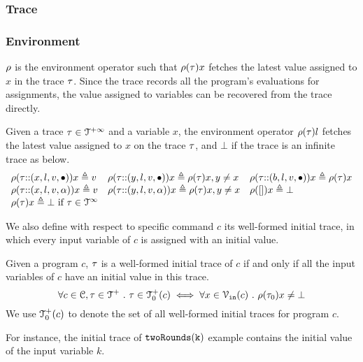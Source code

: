 \subsubsection{Trace}


\subsubsection{Environment} 
$\rho$ is the environment operator such that $\rho(\mathtt{\tau}) x$ fetches the latest value assigned to $x$ in the trace $\mathtt{\tau}$.
Since the trace records all the program's evaluations for assignments, 
the value assigned to variables can be recovered from the trace directly.
 \begin{defn}
 \label{def:adapt_env}
Given a trace $\mathtt{\tau} \in \mathcal{T}^{+\infty}$ and a variable $x$,
the environment operator $\rho(\mathtt{\tau}) l $ fetches the latest value assigned to $x$ on the trace $\mathtt{\tau}$,
and $\bot$ if the trace is an infinite trace as below.
\[
\begin{array}{lll}
\rho(\mathtt{\tau} {\small ::} (x, l, v, \bullet)) x \triangleq v
&
\rho(\mathtt{\tau} {\small ::} (y, l, v, \bullet)) x \triangleq \rho(\mathtt{\tau}) x, y \neq x
&
\rho(\mathtt{\tau} {\small ::} (b, l, v, \bullet)) x \triangleq \rho(\mathtt{\tau}) x
\\
\rho(\mathtt{\tau} {\small ::} (x, l, v, \alpha)) x \triangleq v
&
\rho(\mathtt{\tau} {\small ::} (y, l, v, \alpha)) x \triangleq \rho(\mathtt{\tau}) x, y \neq x
&
\rho({[]} ) x \triangleq \bot
\\
\rho(\mathtt{\tau} ) x \triangleq \bot ~ \text{if}~ \mathtt{\tau} \in \mathcal{T}^{\infty}
\end{array}
\]
\end{defn}
We also define with respect to specific command $c$ its well-formed initial trace, in which
every input variable of $c$ is assigned with an initial value.
\begin{defn}
 \label{def:adaptfun-initial_trace}
 Given a program $c$, $\mathtt{\tau}$ is a well-formed initial trace of $c$ if and only if all the input variables of $c$ have an initial value in this trace.
 \[
 \forall c \in \mathcal{C}, \mathtt{\tau} \in \mathcal{T}^{+} ~.~ \mathtt{\tau} \in \mathcal{T}^{+}_0(c) \iff 
 \forall x \in \mathcal{V}_{\mathtt{in}}(c) ~.~ \rho(\mathtt{\tau}_0) x \neq \bot
 \]
 We use $\mathcal{T}^{+}_0(c)$ to denote the set of all well-formed initial traces for program $c$.
 \end{defn}
 For instance, the initial trace of $\mathtt{twoRounds(k)}$ example contains the initial value of the input variable $k$.

